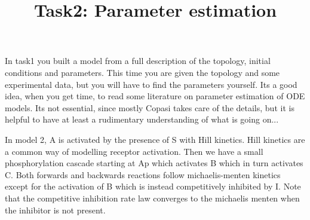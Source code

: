 \documentclass[11pt]{article}
\title{Task2: Parameter estimation}
\begin{document}
\maketitle
    In task1 you built a model from a full description of the topology, initial conditions and parameters. This
    time you are given the topology and some experimental data, but you will have to find the parameters yourself. Its
    a good idea, when you get time, to read some literature on parameter estimation of ODE models. Its not essential,
    since mostly Copasi takes care of the details, but it is helpful to have at least a rudimentary understanding of
    what is going on...

    In model 2, A is activated by the presence of S with Hill kinetics. Hill kinetics are a common way of modelling
    receptor activation. Then we have a small phosphorylation cascade starting at Ap which activates B which in turn
    activates C. Both forwards and backwards reactions follow michaelis-menten kinetics except for the activation of B
    which is instead competitively inhibited by I. Note that the competitive inhibition rate law converges to the
    michaelis menten when the inhibitor is not present. 
\end{document}
